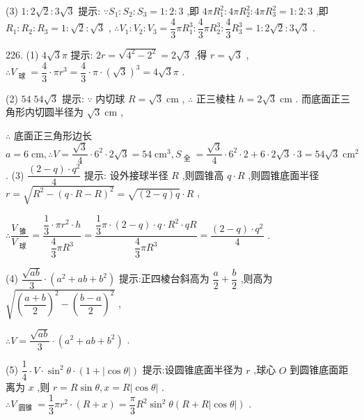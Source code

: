(3) $1 : 2\sqrt{2} : 3\sqrt{3}$ 提示: $\because {S}_{1} : {S}_{2} : {S}_{3} = 1 : 2 : 3$ ,即 ${4\pi }{R}_{1}^{2} : {4\pi }{R}_{2}^{2} : {4\pi }{R}_{3}^{2} = 1 : 2 : 3$ ,即 ${R}_{1} : {R}_{2} : {R}_{3} = 1 : \sqrt{2} : \sqrt{3}$ , $\therefore {V}_{1} : {V}_{2} : {V}_{3} = \dfrac{4}{3}\pi {R}_{1}^{3} : \dfrac{4}{3}\pi {R}_{2}^{3} : \dfrac{4}{3}{R}_{3}^{3} = 1 : 2\sqrt{2} : 3\sqrt{3}$ .

226. (1) $4\sqrt{3}\pi$ 提示: ${2r} = \sqrt{{4}^{2} - {2}^{2}} = 2\sqrt{3}$ ,得 $r = \sqrt{3}$ , $\therefore {V}_{\text{ 球 }} = \dfrac{4}{3} \cdot  \pi {r}^{3} = \dfrac{4}{3} \cdot  \pi  \cdot  {\left( \sqrt{3}\right) }^{3} = 4\sqrt{3}\pi$ .

(2) ${54}\;{54}\sqrt{3}$ 提示: $\because$ 内切球 $R = \sqrt{3}\mathrm{\;{cm}}$ , $\therefore$ 正三棱柱 $h = 2\sqrt{3}\mathrm{\;{cm}}$ . 而底面正三角形内切圆半径为 $\sqrt{3}\mathrm{\;{cm}}$ ,

$\therefore$ 底面正三角形边长 $a = 6\mathrm{\;{cm}},\therefore V = \dfrac{\sqrt{3}}{4} \cdot  {6}^{2} \cdot  2\sqrt{3} = {54}{\mathrm{\;{cm}}}^{3},{S}_{\text{ 全 }} = \dfrac{\sqrt{3}}{4} \cdot  {6}^{2} \cdot  2 + 6 \cdot  2\sqrt{3} \cdot  3 = {54}\sqrt{3}{\mathrm{\;{cm}}}^{2}$ . (3) $\dfrac{\left( {2 - q}\right)  \cdot  {q}^{2}}{4}$ 提示: 设外接球半径 $R$ ,则圆锥高 $q \cdot  R$ ,则圆锥底面半径 $r = \sqrt{{R}^{2} - {\left( q \cdot  R - R\right) }^{2}} = \sqrt{\left( {2 - q}\right) q} \cdot  R$ ,

$\therefore \dfrac{{V}_{\text{ 锥 }}}{{V}_{\text{ 球 }}} = \dfrac{\dfrac{1}{3} \cdot  \pi {r}^{2} \cdot  h}{\dfrac{4}{3}\pi {R}^{3}} = \dfrac{\dfrac{1}{3}\pi  \cdot  \left( {2 - q}\right)  \cdot  q \cdot  {R}^{2} \cdot  {qR}}{\dfrac{4}{3}\pi {R}^{3}} = \dfrac{\left( {2 - q}\right)  \cdot  {q}^{2}}{4}$ .

(4) $\dfrac{\sqrt{ab}}{3} \cdot  \left( {{a}^{2} + {ab} + {b}^{2}}\right)$ 提示:正四棱台斜高为 $\dfrac{a}{2} + \dfrac{b}{2}$ ,则高为 $\sqrt{{\left( \dfrac{a + b}{2}\right) }^{2} - {\left( \dfrac{b - a}{2}\right) }^{2}}$ ,

$\therefore V = \dfrac{\sqrt{ab}}{3} \cdot  \left( {{a}^{2} + {ab} + {b}^{2}}\right)$ .

(5) $\dfrac{1}{4} \cdot  V \cdot  {\sin }^{2}\theta  \cdot  \left( {1 + \left| {\cos \theta }\right| }\right)$ 提示:设圆锥底面半径为 $r$ ,球心 $O$ 到圆锥底面距离为 $x$ ,则 $r = R\sin \theta ,x = R\left| {\cos \theta }\right|$ . $\therefore {V}_{\text{ 圆锥 }} = \dfrac{1}{3}\pi {r}^{2} \cdot  \left( {R + x}\right)  = \dfrac{\pi }{3}{R}^{2}{\sin }^{2}\theta \left( {R + R\left| {\cos \theta }\right| }\right)$ .

